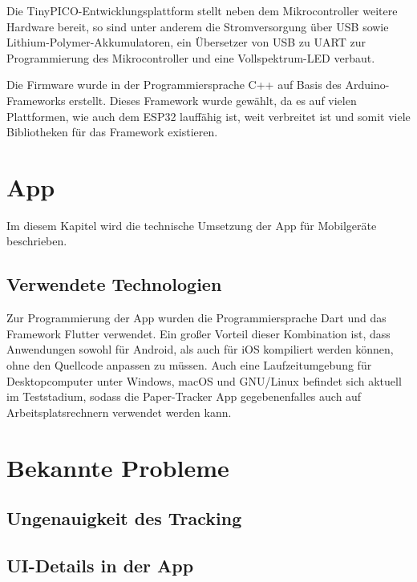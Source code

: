 Die TinyPICO-Entwicklungsplattform stellt neben dem Mikrocontroller weitere Hardware bereit, so sind
unter anderem
die Stromversorgung über \gls{USB} sowie Lithium-Polymer-Akkumulatoren, ein Übersetzer von \gls{USB}
zu \gls{UART} zur Programmierung des Mikrocontroller und eine Vollspektrum-\gls{LED} verbaut.


Die Firmware wurde in der Programmiersprache C++ auf Basis des Arduino-Frameworks erstellt. Dieses
Framework wurde gewählt, da es auf vielen Plattformen, wie auch dem ESP32 lauffähig ist, weit
verbreitet ist und somit viele Bibliotheken für das Framework existieren.


\section{App}

Im diesem Kapitel wird die technische Umsetzung der App für Mobilgeräte beschrieben.

\subsection{Verwendete Technologien}

Zur Programmierung der App wurden die Programmiersprache Dart und das Framework Flutter verwendet.
Ein großer Vorteil dieser Kombination ist, dass Anwendungen sowohl für Android, als auch für iOS
kompiliert werden können, ohne den Quellcode anpassen zu müssen. Auch eine Laufzeitumgebung für
Desktopcomputer unter Windows, macOS und GNU/Linux befindet sich aktuell im Teststadium, sodass die
Paper-Tracker App gegebenenfalles auch auf Arbeitsplatsrechnern verwendet werden kann.

\section{Bekannte Probleme}
\subsection{Ungenauigkeit des Tracking}

\subsection{UI-Details in der App}
